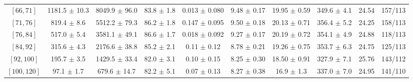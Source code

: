 \begin{tabular}{c||c|c|c|c|c|c|c||c|c}
$[66, 71]$ & 1181.5 $\pm$ 10.3 & 8049.9 $\pm$ 96.0 & 83.8 $\pm$ 1.8 & 0.013 $\pm$ 0.080 & 9.48 $\pm$ 0.17 & 19.95 $\pm$ 0.59 & 349.6 $\pm$ 4.1 & 24.54 & 157/113\\
$[71, 76]$ & 819.4 $\pm$ 8.6 & 5512.2 $\pm$ 79.3 & 86.2 $\pm$ 1.8 & 0.147 $\pm$ 0.095 & 9.50 $\pm$ 0.18 & 20.13 $\pm$ 0.71 & 356.4 $\pm$ 5.2 & 24.25 & 158/113\\
$[76, 84]$ & 517.0 $\pm$ 5.4 & 3581.1 $\pm$ 49.1 & 86.6 $\pm$ 1.7 & 0.018 $\pm$ 0.092 & 9.27 $\pm$ 0.17 & 20.19 $\pm$ 0.72 & 354.1 $\pm$ 4.9 & 24.88 & 118/113\\
$[84, 92]$ & 315.6 $\pm$ 4.3 & 2176.6 $\pm$ 38.8 & 85.2 $\pm$ 2.1 & 0.11 $\pm$ 0.12 & 8.78 $\pm$ 0.21 & 19.26 $\pm$ 0.75 & 353.7 $\pm$ 6.3 & 24.75 & 125/113\\
$[92, 100]$ & 195.7 $\pm$ 3.5 & 1429.5 $\pm$ 33.4 & 82.0 $\pm$ 3.1 & 0.10 $\pm$ 0.15 & 8.25 $\pm$ 0.30 & 18.50 $\pm$ 0.91 & 327.9 $\pm$ 7.1 & 25.76 & 143/112\\
$[100, 120]$ & 97.1 $\pm$ 1.7 & 679.6 $\pm$ 14.7 & 82.2 $\pm$ 5.1 & 0.07 $\pm$ 0.13 & 8.27 $\pm$ 0.38 & 16.9 $\pm$ 1.3 & 337.0 $\pm$ 7.0 & 24.95 & 141/110\\
\end{tabular}
